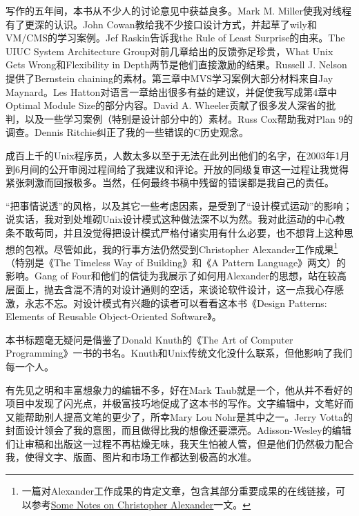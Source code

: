 \documentclass[12pt,oneside]{book}
\begin{document}
写作的五年间，本书从不少人的讨论意见中获益良多。Mark M. Miller使我对线程有了更深的认识。John Cowan教给我不少接口设计方式，并起草了wily和VM/CMS的学习案例。Jef Raskin告诉我the Rule of Least Surprise的由来。The UIUC System Architecture Group对前几章给出的反馈弥足珍贵，What Unix Gets Wrong和Flexibility in Depth两节是他们直接激励的结果。Russell J. Nelson提供了Bernstein chaining的素材。第三章中MVS学习案例大部分材料来自Jay Maynard。Les Hatton对语言一章给出很多有益的建议，并促使我写成第4章中Optimal Module Size的部分内容。David A. Wheeler贡献了很多发人深省的批判，以及一些学习案例（特别是设计部分中的）素材。Russ Cox帮助我对Plan 9的调查。Dennis Ritchie纠正了我的一些错误的C历史观念。

成百上千的Unix程序员，人数太多以至于无法在此列出他们的名字，在2003年1月到6月间的公开审阅过程间给了我建议和评论。开放的同级复审这一过程让我觉得紧张刺激而回报极多。当然，任何最终书稿中残留的错误都是我自己的责任。

“把事情说透”的风格，以及其它一些考虑因素，是受到了“设计模式运动”的影响；说实话，我对到处堆砌Unix设计模式这种做法深不以为然。我对此运动的中心教条不敢苟同，并且没觉得把设计模式严格付诸实用有什么必要，也不想背上这种思想的包袱。尽管如此，我的行事方法仍然受到Christopher Alexander工作成果\footnote{一篇对Alexander工作成果的肯定文章，包含其部分重要成果的在线链接，可以参考\href{http://www.math.utsa.edu/sphere/salingar/Chris.text.html}{Some Notes on Christopher Alexander}一文。}（特别是《The Timeless Way of Building》和《A Pattern Language》两文）的影响。Gang of Four和他们的信徒为我展示了如何用Alexander的思想，站在较高层面上，抛去含混不清的对设计通则的空话，来谈论软件设计，这一点我心存感激，永志不忘。对设计模式有兴趣的读者可以看看这本书《Design Patterns: Elements of Reusable Object-Oriented Software\cite{GangOfFour}》。

本书标题毫无疑问是借鉴了Donald Knuth的《The Art of Computer Programming》一书的书名。Knuth和Unix传统文化没什么联系，但他影响了我们每一个人。

有先见之明和丰富想象力的编辑不多，好在Mark Taub就是一个，他从并不看好的项目中发现了闪光点，并极富技巧地促成了这本书的写作。文字编辑中，文笔好而又能帮助别人提高文笔的更少了，所幸Mary Lou Nohr是其中之一。Jerry Votta的封面设计领会了我的意图，而且做得比我的想像还要漂亮。Adisson-Wesley的编辑们让审稿和出版这一过程不再枯燥无味，我天生怕被人管，但是他们仍然极力配合我，使得文字、版面、图片和市场工作都达到极高的水准。




\setcounter{tocdepth}{3}    
\tableofcontents
\end{document}
